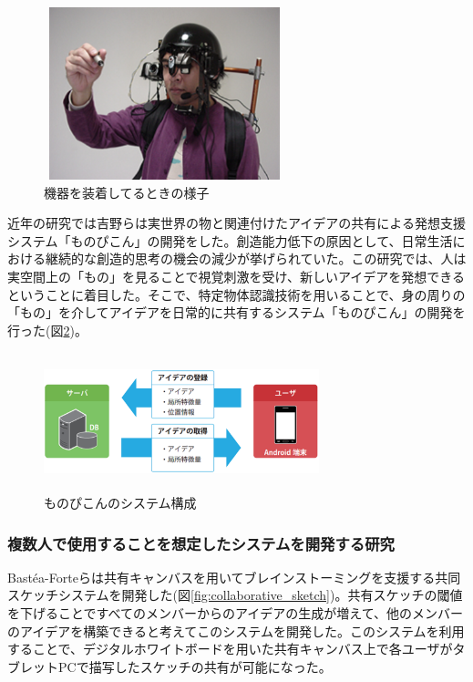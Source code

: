 \documentclass[11pt,a4j, titlepage]{jarticle} %
\begin{document}
\begin{figure}[H]
  \begin{center}
    \includegraphics[clip,height=5.0cm,width=7.0cm]{./informal2.eps}
    \caption{機器を装着してるときの様子}
    \label{fig:informal2}
  \end{center}
\end{figure}

近年の研究では吉野ら\cite{yoshino}は実世界の物と関連付けたアイデアの共有による発想支援システム「ものぴこん」の開発をした。創造能力低下の原因として、日常生活における継続的な創造的思考の機会の減少が挙げられていた。この研究では、人は実空間上の「もの」を見ることで視覚刺激を受け、新しいアイデアを発想できるということに着目した。そこで、特定物体認識技術を用いることで、身の周りの「もの」を介してアイデアを日常的に共有するシステム「ものぴこん」の開発を行った(図\ref{fig:monopikon})。

\begin{figure}[H]
  \begin{center}
    \includegraphics[clip,height=4.0cm,width=8.0cm]{./monopikon.eps}
    \caption{ものぴこんのシステム構成}
    \label{fig:monopikon}
  \end{center}
\end{figure}

\subsubsection{複数人で使用することを想定したシステムを開発する研究}
Bast\'ea-Forteら\cite{bastea}は共有キャンバスを用いてブレインストーミングを支援する共同スケッチシステムを開発した(図\ref{fig:collaborative_sketch})。共有スケッチの閾値を下げることですべてのメンバーからのアイデアの生成が増えて、他のメンバーのアイデアを構築できると考えてこのシステムを開発した。このシステムを利用することで、デジタルホワイトボードを用いた共有キャンバス上で各ユーザがタブレットPCで描写したスケッチの共有が可能になった。
\end{document}
